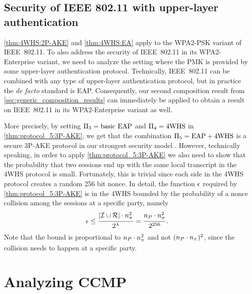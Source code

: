 \subsection{Security of IEEE 802.11 with upper-layer authentication}\label{sec:802.11:upper-layer_authentication}

\cref{thm:4WHS:2P-AKE} and \cref{thm:4WHS:EA} apply to the WPA2-PSK variant of IEEE~802.11.
To also address the security of IEEE~802.11 in its WPA2-Enterprise variant,
we need to analyze the setting where the PMK is provided by some upper-layer authentication protocol.
Technically,
IEEE~802.11 can be combined with any type of upper-layer authentication protocol,
but in practice the \emph{de facto} standard is EAP.
Consequently,
our second composition result from \cref{sec:generic_composition_results} can immediately be applied to obtain a result on IEEE~802.11 in its  WPA2-Enterprise variant as well.

More precisely,
by setting  $\mathrm{\Pi}_3 = \text{basic EAP}$ and $\mathrm{\Pi}_4 = \operatorname{4WHS}$ in \cref{thm:protocol_5:3P-AKE}, 
we get that the combination $\mathrm{\Pi}_5 = \text{EAP} + \text{4WHS}$ is a secure 3P-AKE protocol in our strongest security model \akefstext.
However,
technically speaking,
in order to apply \cref{thm:protocol_5:3P-AKE} we also need to show that the probability that two sessions end up with the same local transcript in the 4WHS protocol is small.
Fortunately,
this is trivial since each side in the 4WHS protocol creates a random 256 bit nonce.
In detail,
the function $\epsilon$ required by \cref{thm:protocol_5:3P-AKE} is in the 4WHS bounded by the probability of a nonce collision among the sessions at a specific party,
namely
\begin{equation}
	\transcriptcollisionfunc  
		\leq \frac{| \Inits \cup \Responders | \cdot  \numsessions^2}{2^\noncelen} 
		= \frac{\numparties \cdot  \numsessions^2}{2^{256}} .
\end{equation}
Note that the bound is proportional to $\numparties \cdot  \numsessions^2$ and not $(\numparties \cdot \numsessions)^2$,
since the collision needs to happen at a specific party.
 







\section{Analyzing CCMP}\label{sec:802.11:CCMP}

